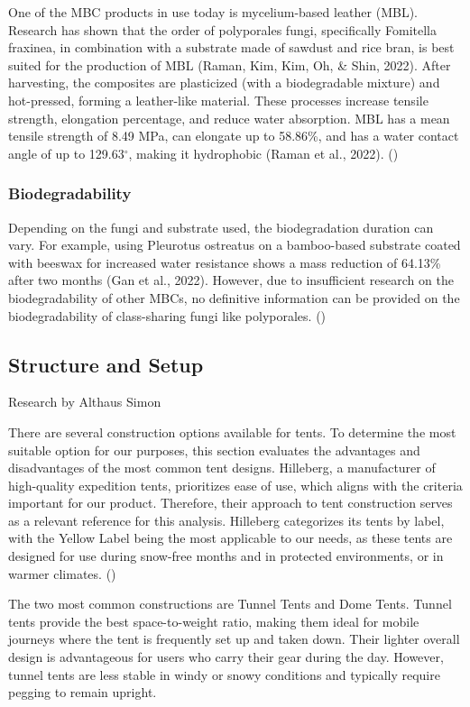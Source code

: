\documentclass{article}
\begin{document}
One of the MBC products in use today is mycelium-based leather (MBL).
Research has shown that the order of polyporales fungi, specifically
Fomitella fraxinea, in combination with a substrate made of sawdust
and rice bran, is best suited for the production of MBL
(Raman, Kim, Kim, Oh, \& Shin, 2022). After harvesting, the
composites are plasticized (with a biodegradable mixture) and
hot-pressed, forming a leather-like material. These processes
increase tensile strength, elongation percentage, and reduce water
absorption. MBL has a mean tensile strength of 8.49 MPa, can elongate
up to 58.86\%, and has a water contact angle of up to 129.63$^{\circ}$,
making it hydrophobic (Raman et al., 2022). (\cite{env3})

\subsubsection{Biodegradability}

Depending on the fungi and substrate used, the biodegradation
duration can vary. For example, using Pleurotus ostreatus on a
bamboo-based substrate coated with beeswax for increased water
resistance shows a mass reduction of 64.13\% after two months
(Gan et al., 2022). However, due to insufficient research on the
biodegradability of other MBCs, no definitive information can be
provided on the biodegradability of class-sharing fungi like
polyporales. (\cite{env2})

\subsection{Structure and Setup}
{\small Research by Althaus Simon}

There are several construction options available for tents. To determine the most suitable
option for our purposes, this section evaluates the advantages and disadvantages of the
most common tent designs. Hilleberg, a manufacturer of high-quality expedition tents,
prioritizes ease of use, which aligns with the criteria important for our product.
Therefore, their approach to tent construction serves as a relevant reference for this
analysis. Hilleberg categorizes its tents by label, with the Yellow Label being the most
applicable to our needs, as these tents are designed for use during snow-free months and
in protected environments, or in warmer climates. (\cite{setup1})

The two most common constructions are Tunnel Tents and Dome Tents. 
Tunnel tents provide the best space-to-weight ratio, making them ideal for mobile journeys
where the tent is frequently set up and taken down. Their lighter overall design is
advantageous for users who carry their gear during the day. However, tunnel tents are less
stable in windy or snowy conditions and typically require pegging to remain upright.
\end{document}
